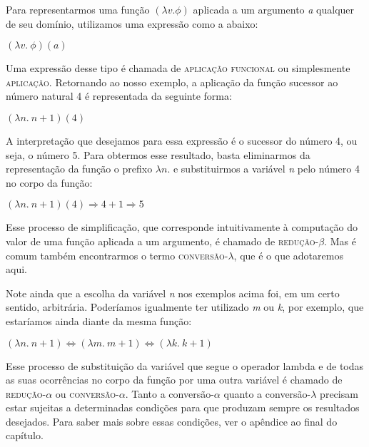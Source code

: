 Para representarmos uma função $(\lambda v. \phi)$
aplicada a um argumento \textit{a}
qualquer de seu domínio, utilizamos uma expressão como a abaixo:

\begin{exe}
	\ex $(\lambda v.\ \phi)(a)$
\end{exe}

\n Uma expressão desse tipo é chamada de \textsc{aplicação
funcional} ou simplesmente \textsc{aplicação}. Retornando ao
nosso exemplo, a aplicação da função sucessor ao número
natural 4 é
representada da seguinte forma:

\begin{exe}
	\ex $(\lambda n.\ n + 1)(4)$
\end{exe}

\n A interpretação que desejamos para essa expressão é o
sucessor do número 4, ou seja, o número 5. Para obtermos esse
resultado, basta eliminarmos da representação da função o
prefixo $\lambda n.$ e substituirmos a variável \textit{n} pelo
número
4 no corpo da função:

\begin{exe}
	\ex $(\lambda n.\ n + 1)(4) \Rightarrow 4 + 1 \Rightarrow 5$
\end{exe}

\n Esse processo de simplificação, que corresponde
intuitivamente à computação do valor de uma função aplicada a
um argumento, é chamado de \textsc{redução}-$\beta$. Mas é comum
também encontrarmos o termo \textsc{conversão}-$\lambda$, que é o
que adotaremos aqui.

Note ainda que a
escolha da variável \textit{n} nos exemplos acima foi, em um certo
sentido, arbitrária. Poderíamos igualmente ter utilizado \textit{m}
ou \textit{k}, por exemplo, que estaríamos ainda diante da mesma
função:

\begin{exe}
	\ex $(\lambda n.\ n + 1) \Leftrightarrow (\lambda m.\ m + 1) \Leftrightarrow (\lambda k.\ k + 1)$
\end{exe}

\n Esse processo de substituição da variável que segue o
operador lambda e de todas as suas ocorrências no corpo da
função por uma outra variável é chamado de
\textsc{redução}-$\alpha$ ou \textsc{conversão}-$\alpha$. Tanto a conversão-$\alpha$ quanto a conversão-$\lambda$ precisam estar sujeitas a determinadas condições para que produzam sempre os resultados desejados. Para saber mais sobre essas condições, ver o apêndice ao final do capítulo.

